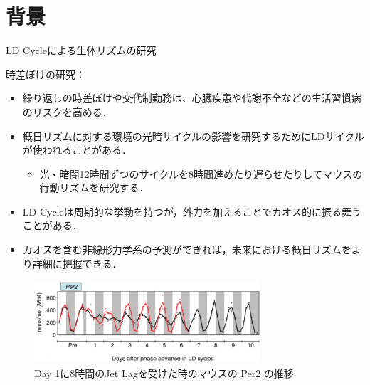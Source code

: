 \section{背景}

\begin{frame}{LD Cycleによる生体リズムの研究}
    \begin{minipage}{0.49\linewidth}
        時差ぼけの研究：
        \begin{itemize}
            \item 繰り返しの時差ぼけや交代制勤務は、心臓疾患や代謝不全などの生活習慣病のリスクを高める．
            \item 概日リズムに対する環境の光暗サイクルの影響を研究するためにLDサイクルが使われることがある．\begin{itemize}
                \item 光・暗闇12時間ずつのサイクルを8時間進めたり遅らせたりしてマウスの行動リズムを研究する．
            \end{itemize}
        \end{itemize}
    \end{minipage}
    \begin{minipage}{0.5\linewidth}
        \begin{itemize}
            \item LD Cycleは周期的な挙動を持つが，外力を加えることでカオス的に振る舞うことがある．
            \item カオスを含む非線形力学系の予測ができれば，未来における概日リズムをより詳細に把握できる．
        \end{itemize}
        \begin{figure}
            \includegraphics[width=0.75\textwidth]{Fig/Jetlag.png}
            \caption{Day 1に8時間のJet Lagを受けた時のマウスの Per2 の推移}
            \label{jetlag} 
        \end{figure}    
    \end{minipage}
\end{frame}

